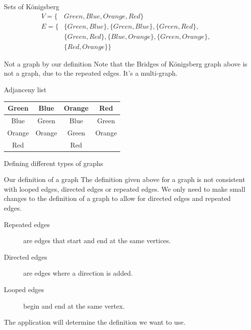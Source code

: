 \documentclass[dvipsnames, hidelinks]{beamer}
\begin{document}
  
  \begin{frame}{Sets of K{\"o}nigsberg}
    \begin{align*}
      V = \{&Green, Blue, Orange, Red\} \\[5mm]
      E = \{&\{Green, Blue\}, \{Green, Blue\}, \{Green, Red\},\\
          &\{Green, Red\}, \{Blue, Orange\}, \{Green, Orange\},\\
          &\{Red, Orange\}\}
    \end{align*}
  
    \begin{alertblock}{Not a graph by our definition}
    Note that the Bridges of K{\"o}nigsberg graph above is not a graph, due to the repeated edges.
    It's a multi-graph.
    \end{alertblock}
  \end{frame}
  
  \begin{frame}{Adjanceny list}
    \begin{center}
    \begin{tabular}{c@{\hskip 0.5cm}c@{\hskip 0.5cm}c@{\hskip 0.5cm}c}
    Green & Blue & Orange & Red \\
    \midrule
    Blue & Green & Blue & Green \\
    Orange & Orange & Green & Orange \\
    Red & & Red & \\
    \end{tabular}
    \end{center}
  \end{frame}
  
  \begin{frame}{Defining different types of graphs}
    
    \begin{block}{Our definition of a graph}
    The definition given above for a graph is not consistent with looped edges, directed edges or repeated edges. We only need to make small changes to the definition of a graph to allow for directed edges and repeated edges.
    \end{block}
    
    \begin{description}
      \item[Repeated edges] are edges that start and end at the same vertices.
      \item[Directed edges] are edges where a direction is added.
      \item[Looped edges] begin and end at the same vertex.
    \end{description}
    
    The application will determine the definition we want to use.
  \end{frame}
  
\end{document}
